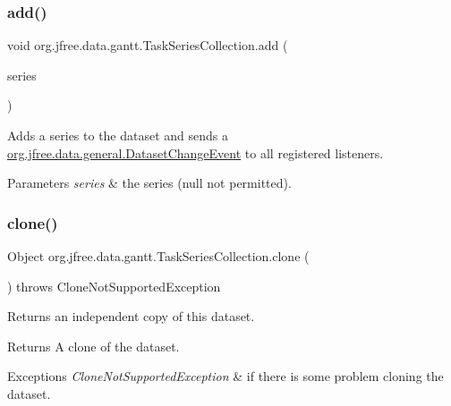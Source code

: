 \subsubsection{\texorpdfstring{add()}{add()}}
{\footnotesize\ttfamily void org.\+jfree.\+data.\+gantt.\+Task\+Series\+Collection.\+add (\begin{DoxyParamCaption}\item[{\mbox{\hyperlink{classorg_1_1jfree_1_1data_1_1gantt_1_1_task_series}{Task\+Series}}}]{series }\end{DoxyParamCaption})}

Adds a series to the dataset and sends a \mbox{\hyperlink{classorg_1_1jfree_1_1data_1_1general_1_1_dataset_change_event}{org.\+jfree.\+data.\+general.\+Dataset\+Change\+Event}} to all registered listeners.


\begin{DoxyParams}{Parameters}
{\em series} & the series ({\ttfamily null} not permitted). \\
\hline
\end{DoxyParams}
\mbox{\label{classorg_1_1jfree_1_1data_1_1gantt_1_1_task_series_collection_a7cfdabdbf256ff3ba7e72bb5ff175ee5}} 
\subsubsection{\texorpdfstring{clone()}{clone()}}
{\footnotesize\ttfamily Object org.\+jfree.\+data.\+gantt.\+Task\+Series\+Collection.\+clone (\begin{DoxyParamCaption}{ }\end{DoxyParamCaption}) throws Clone\+Not\+Supported\+Exception}

Returns an independent copy of this dataset.

\begin{DoxyReturn}{Returns}
A clone of the dataset.
\end{DoxyReturn}

\begin{DoxyExceptions}{Exceptions}
{\em Clone\+Not\+Supported\+Exception} & if there is some problem cloning the dataset. \\
\hline
\end{DoxyExceptions}
\mbox{\label{classorg_1_1jfree_1_1data_1_1gantt_1_1_task_series_collection_a3a749c23d13feb1598f61ffa0ebfe2cc}} 
